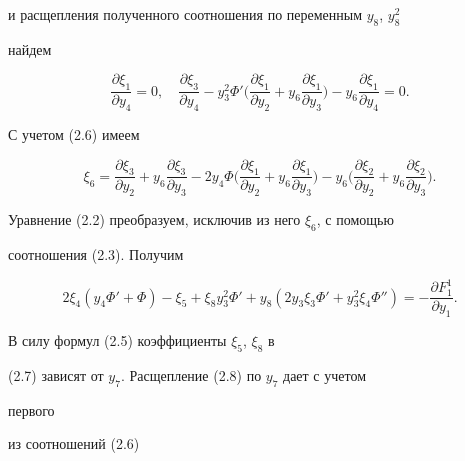 и расщепления полученного соотношения по переменным $y_8$, $y^2_8$


найдем 


\begin{equation} 


\frac{\partial\xi_1}{\partial y_4}=0,\quad 


\frac{\partial\xi_3}{\partial y_4}-y^2_3\Phi'\bigg( 


\frac{\partial\xi_1}{\partial y_2}+y_6 


\frac{\partial\xi_1}{\partial y_3}\bigg)-y_6 


\frac{\partial\xi_1}{\partial y_4}=0.\tag{2.6} 


\end{equation} 


С учетом (2.6) имеем 


\begin{equation} 


\xi_6=\frac{\partial\xi_3}{\partial y_2}+y_6 


\frac{\partial\xi_3}{\partial y_3}-2y_4\Phi\bigg( 


\frac{\partial\xi_1}{\partial y_2}+y_6 


\frac{\partial\xi_1}{\partial y_3}\bigg)-y_6 


\bigg(\frac{\partial\xi_2}{\partial y_2}+y_6 


\frac{\partial\xi_2}{\partial y_3}\bigg).\tag{2.7} 


\end{equation} 


 


Уравнение (2.2) преобразуем, исключив из него $\xi_6$, с помощью 


соотношения (2.3). Получим 


\begin{equation} 


2\xi_4(y_4\Phi'+\Phi)-\xi_5+\xi_8y^2_3\Phi'+ 


y_8(2y_3\xi_3\Phi'+y^2_3\xi_4\Phi'')= 


-\frac{\partial F^1_1}{\partial y_1}.\tag{2.8} 


\end{equation} 


В силу формул (2.5) коэффициенты $\xi_5$, $\xi_8$ в 


(2.7) зависят от $y_7$. Расщепление (2.8) по $y_7$ дает с учетом 


первого 


из соотношений (2.6) 


